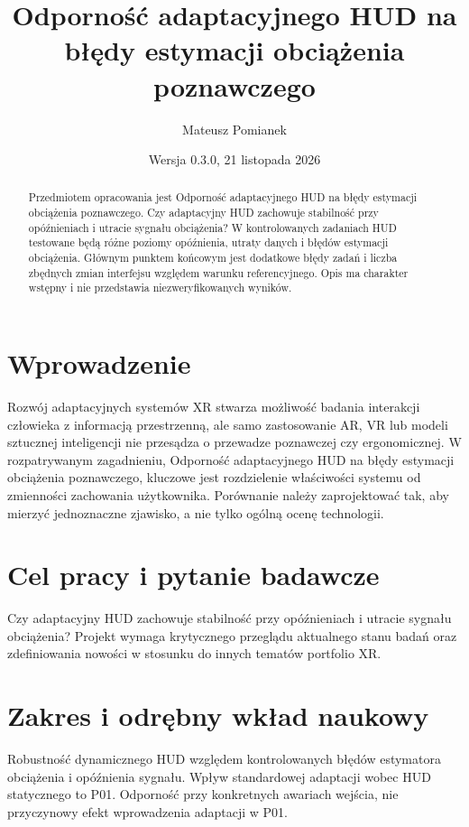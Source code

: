 \documentclass[11pt,a4paper]{article}
\title{Odporność adaptacyjnego HUD na błędy estymacji obciążenia poznawczego}
\author{Mateusz Pomianek}
\date{Wersja 0.3.0, 21 listopada 2026}
\begin{document}
\maketitle

\begin{abstract}

Przedmiotem opracowania jest Odporność adaptacyjnego HUD na błędy estymacji obciążenia poznawczego. Czy adaptacyjny HUD zachowuje stabilność przy opóźnieniach i utracie sygnału obciążenia? W kontrolowanych zadaniach HUD testowane będą różne poziomy opóźnienia, utraty danych i błędów estymacji obciążenia. Głównym punktem końcowym jest dodatkowe błędy zadań i liczba zbędnych zmian interfejsu względem warunku referencyjnego. Opis ma charakter wstępny i nie przedstawia niezweryfikowanych wyników.

\end{abstract}

\section{Wprowadzenie}

Rozwój adaptacyjnych systemów XR stwarza możliwość badania interakcji człowieka z informacją przestrzenną, ale samo zastosowanie AR, VR lub modeli sztucznej inteligencji nie przesądza o przewadze poznawczej czy ergonomicznej. W rozpatrywanym zagadnieniu, Odporność adaptacyjnego HUD na błędy estymacji obciążenia poznawczego, kluczowe jest rozdzielenie właściwości systemu od zmienności zachowania użytkownika. Porównanie należy zaprojektować tak, aby mierzyć jednoznaczne zjawisko, a nie tylko ogólną ocenę technologii.

\section{Cel pracy i pytanie badawcze}

Czy adaptacyjny HUD zachowuje stabilność przy opóźnieniach i utracie sygnału obciążenia? Projekt wymaga krytycznego przeglądu aktualnego stanu badań oraz zdefiniowania nowości w stosunku do innych tematów portfolio XR.

\section{Zakres i odrębny wkład naukowy}
Robustność dynamicznego HUD względem kontrolowanych błędów estymatora obciążenia i opóźnienia sygnału. Wpływ standardowej adaptacji wobec HUD statycznego to P01. Odporność przy konkretnych awariach wejścia, nie przyczynowy efekt wprowadzenia adaptacji w P01.
\end{document}
